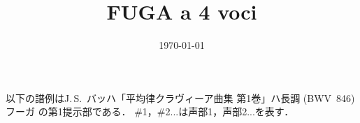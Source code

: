 \documentclass[a4paper,11pt]{ltjsarticle}
\title{FUGA a 4 voci}
\author{}
\date{\today}
\begin{document}
\maketitle

以下の譜例はJ.\,S.~バッハ「平均律クラヴィーア曲集 第1巻」ハ長調 (BWV~846) フーガ
の第1提示部である．
\#1，\#2...は声部1，声部2...を表す．

\end{document}
